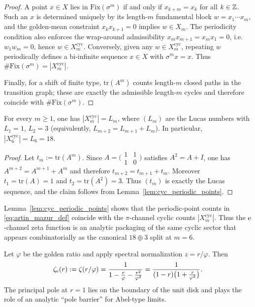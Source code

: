 \begin{proof}
A point $x\in X$ lies in $\mathrm{Fix}(\sigma^m)$ if and only if $x_{k+m}=x_k$ for all $k\in\mathbb{Z}$.
Such an $x$ is determined uniquely by its length-$m$ fundamental block $w=x_1\cdots x_m$, and the golden-mean constraint $x_kx_{k+1}=0$ implies $w\in X_m$.
The periodicity condition also enforces the wrap-around admissibility $x_mx_{m+1}=x_mx_1=0$, i.e.\ $w_1w_m=0$, hence $w\in X_m^{\mathrm{cyc}}$.
Conversely, given any $w\in X_m^{\mathrm{cyc}}$, repeating $w$ periodically defines a bi-infinite sequence $x\in X$ with $\sigma^m x=x$.
Thus $\#\mathrm{Fix}(\sigma^m)=|X_m^{\mathrm{cyc}}|$.
\par
Finally, for a shift of finite type, $\mathrm{tr}(A^m)$ counts length-$m$ closed paths in the transition graph; these are exactly the admissible length-$m$ cycles and therefore coincide with $\#\mathrm{Fix}(\sigma^m)$.
\end{proof}
%
\begin{corollary}\label{cor:cyc_lucas}
For every $m\ge 1$, one has $|X_m^{\mathrm{cyc}}|=L_m$, where $(L_m)$ are the Lucas numbers with $L_1=1$, $L_2=3$ (equivalently, $L_{m+2}=L_{m+1}+L_m$).
In particular, $|X_6^{\mathrm{cyc}}|=L_6=18$.
\end{corollary}
\begin{proof}
Let $t_m:=\mathrm{tr}(A^m)$.
Since $A=\bigl(\begin{smallmatrix}1&1\\[2pt]1&0\end{smallmatrix}\bigr)$ satisfies $A^2=A+I$, one has $A^{m+2}=A^{m+1}+A^m$ and therefore $t_{m+2}=t_{m+1}+t_m$.
Moreover $t_1=\mathrm{tr}(A)=1$ and $t_2=\mathrm{tr}(A^2)=3$.
Thus $(t_m)$ is exactly the Lucas sequence, and the claim follows from Lemma~\ref{lem:cyc_periodic_points}.
\end{proof}
%
\begin{remark}\label{rem:pi_channel_zeta_coeffs}
Lemma~\ref{lem:cyc_periodic_points} shows that the periodic-point counts in \eqref{eq:artin_mazur_def} coincide with the $\pi$-channel cyclic counts $|X_m^{\mathrm{cyc}}|$.
Thus the $\mathrm{e}$-channel zeta function is an analytic packaging of the same cyclic sector that appears combinatorially as the canonical $18\oplus 3$ split at $m=6$.
\end{remark}
Let $\varphi$ be the golden ratio and apply spectral normalization $z=r/\varphi$.
Then
\begin{equation}\label{eq:abel_normalized_zeta}
\zeta_{\mathrm{e}}(r):=\zeta(r/\varphi)=\frac{1}{1-\frac{r}{\varphi}-\frac{r^2}{\varphi^2}}
=\frac{1}{(1-r)\bigl(1+\frac{r}{\varphi^2}\bigr)}.
\end{equation}
The principal pole at $r=1$ lies on the boundary of the unit disk and plays the role of an analytic ``pole barrier'' for Abel-type limits.

